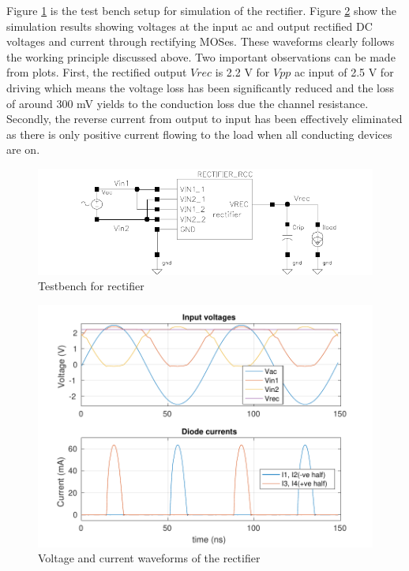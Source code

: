 \documentclass[UKenglish]{ifimaster}  %
\begin{document}
Figure \ref{rect_tb} is the test bench setup for simulation of the rectifier. Figure \ref{rect_plot} show the simulation results showing voltages at the input ac and output rectified DC 
voltages and current through rectifying MOSes. These  
waveforms clearly follows the working principle discussed above. Two important observations can be made from 
plots. First, the rectified output $Vrec$ is 2.2 V for $Vpp$ ac input of 2.5 V for driving which means the 
voltage loss has been significantly reduced and the loss of around 300 mV yields to the conduction loss due 
the channel resistance. Secondly, the reverse current from output to input has been effectively eliminated as 
there is only positive current flowing to the load when all conducting devices 
are on.  \\

\begin{figure}[!htbp] %
   \centering
   \includegraphics[width=\textwidth]{img/rectifier_testbench.pdf} 
   \caption{Testbench for rectifier}
   \label{rect_tb}
\end{figure}

\begin{figure}[!htbp] %
   \centering
   \includegraphics[width=\textwidth]{img/rectifier_VI.pdf} 
   \caption{Voltage and current waveforms of the rectifier}
   \label{rect_plot}
\end{figure}
\end{document}

